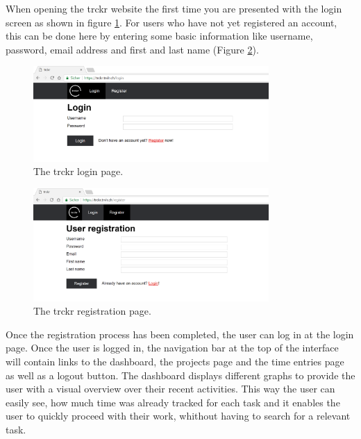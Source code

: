 \documentclass[bibliography=totoc, listof=totocnumbered]{scrartcl}
\begin{document}

When opening the trckr website the first time you are presented with the login
screen as shown in figure \ref{fig:trckr-login}. For users who have not yet
registered an account, this can be done here by entering some basic information
like username, password, email address and first and last name (Figure
\ref{fig:trckr-register}).

\begin{figure}[h]
    \includegraphics[width=0.8\textwidth]{trckr-login}
    \caption{The trckr login page.}
    \label{fig:trckr-login}
\end{figure}

\begin{figure}[h]
    \includegraphics[width=0.8\textwidth]{trckr-register}
    \caption{The trckr registration page.}
    \label{fig:trckr-register}
\end{figure}

Once the registration process has been completed, the
user can log in at the login page. Once the user is logged in, the navigation
bar at the top of the interface will contain links to the dashboard, the
projects page and the time entries page as well as a logout button. The dashboard
displays different graphs to provide the user with a visual overview over their recent activities.
This way the user can easily see, how much time was already tracked for each task and it enables
the user to quickly proceed with their work, whithout having to search for a relevant task.
\end{document}
